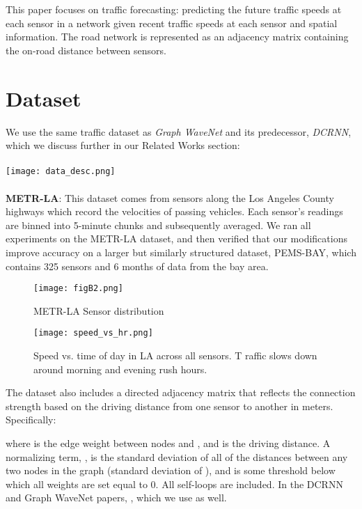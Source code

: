 \documentclass[10pt]{article}
\begin{document}
This paper focuses on traffic forecasting: predicting the future traffic speeds at each sensor in a network given recent traffic speeds at each sensor and spatial information. The road network is represented as an adjacency matrix containing the on-road distance between sensors.

\section{Dataset}

We use the same traffic dataset as \textit{Graph WaveNet} and its predecessor, \textit{DCRNN}, which we discuss further in our Related Works section:\\\\
\texttt{[image: data\_desc.png]} \\\\
\textbf{METR-LA}: This dataset comes from sensors along the Los Angeles County highways which record the velocities of passing vehicles. Each sensor's readings are binned into 5-minute chunks and subsequently averaged. We ran all experiments on the METR-LA dataset, and then verified that our modifications improve accuracy on a larger but similarly structured dataset, PEMS-BAY, which contains 325 sensors and 6 months of data from the bay area.
\begin{table}[H]
    \begin{minipage}{.5\linewidth}
    \centering
    \begin{figure}[H]
        \centering
    \texttt{[image: figB2.png]}
    \caption{METR-LA Sensor distribution}
    \end{figure}
    \end{minipage}
    \begin{minipage}{.5\linewidth}
      \centering
        \begin{figure}[H]
        \texttt{[image: speed\_vs\_hr.png]}
        \caption{Speed vs. time of day in LA across all sensors. T raffic slows down around morning and evening rush hours.}
        \end{figure}
    \end{minipage}
    \label{tab:degree_stats}
\end{table}

The dataset also includes a directed adjacency matrix that reflects the connection strength based on the driving distance from one sensor to another in meters. Specifically:

where  is the edge weight between nodes  and , and  is the driving distance. A normalizing term, , is the standard deviation of all of the distances between any two nodes in the graph (standard deviation of ), and  is some threshold below which all weights are set equal to 0. All self-loops are included.  In the DCRNN and Graph WaveNet papers, , which we use as well.
\end{document}
